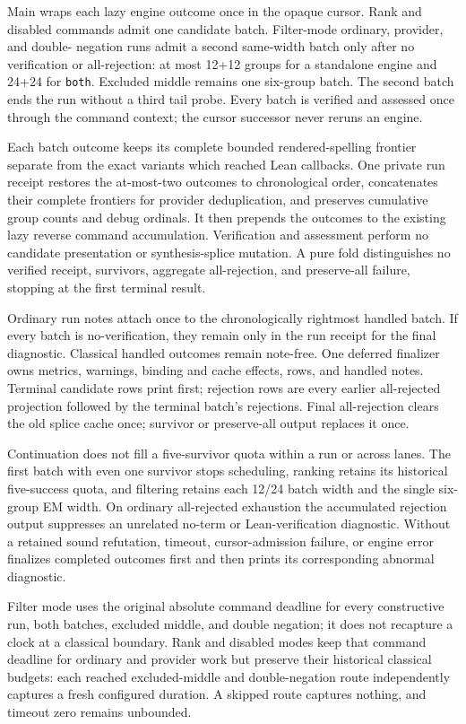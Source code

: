 \documentclass[11pt,oneside]{article}
\newcommand{\code}[1]{\texttt{#1}}
\begin{document}
Main wraps each lazy engine outcome once in the opaque cursor. Rank and disabled
commands admit one candidate batch. Filter-mode ordinary, provider, and double-
negation runs admit a second same-width batch only after no verification or
all-rejection: at most 12+12 groups for a standalone engine and 24+24 for
\code{both}. Excluded middle remains one six-group batch. The second batch ends
the run without a third tail probe. Every batch is verified and assessed once
through the command context; the cursor successor never reruns an engine.

Each batch outcome keeps its complete bounded rendered-spelling frontier
separate from the exact variants which reached Lean callbacks. One private run
receipt restores the at-most-two outcomes to chronological order, concatenates
their complete frontiers for provider deduplication, and preserves cumulative
group counts and debug ordinals. It then prepends the outcomes to the existing
lazy reverse command accumulation. Verification and assessment perform no
candidate presentation or synthesis-splice mutation. A pure fold distinguishes
no verified receipt, survivors, aggregate all-rejection, and preserve-all
failure, stopping at the first terminal result.

Ordinary run notes attach once to the chronologically rightmost handled batch.
If every batch is no-verification, they remain only in the run receipt for the
final diagnostic. Classical handled outcomes remain note-free. One deferred
finalizer owns metrics, warnings, binding and cache effects, rows, and handled
notes. Terminal candidate rows print first; rejection rows are every earlier
all-rejected projection followed by the terminal batch's rejections. Final
all-rejection clears the old splice cache once; survivor or preserve-all output
replaces it once.

Continuation does not fill a five-survivor quota within a run or across lanes.
The first batch with even one survivor stops scheduling, ranking retains its
historical five-success quota, and filtering retains each 12/24 batch width and
the single six-group EM width. On ordinary
all-rejected exhaustion the accumulated rejection output suppresses an
unrelated no-term or Lean-verification diagnostic. Without a retained sound
refutation, timeout, cursor-admission failure, or engine error finalizes
completed outcomes first and then prints its corresponding abnormal diagnostic.

Filter mode uses the original absolute command deadline for every constructive
run, both batches, excluded middle, and double negation; it does not recapture a
clock at a classical boundary. Rank and disabled modes keep that command
deadline for ordinary and provider work but preserve their historical
classical budgets: each reached excluded-middle and double-negation route
independently captures a fresh configured duration. A skipped route captures
nothing, and timeout zero remains unbounded.
\end{document}
